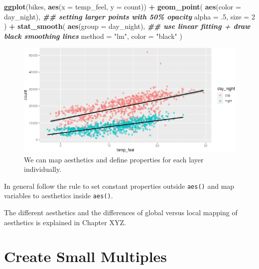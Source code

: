 \documentclass[
]{krantz}
\makeatletter
\newenvironment{Shaded}{\begin{snugshade}}{\end{snugshade}}
\newcommand{\AttributeTok}[1]{\textcolor[rgb]{0.27,0.27,0.27}{#1}}
\newcommand{\DecValTok}[1]{\textcolor[rgb]{0.06,0.06,0.06}{#1}}
\newcommand{\DocumentationTok}[1]{\textcolor[rgb]{0.37,0.37,0.37}{\textbf{\textit{#1}}}}
\newcommand{\FunctionTok}[1]{\textcolor[rgb]{0.27,0.27,0.27}{\textbf{#1}}}
\newcommand{\NormalTok}[1]{#1}
\newcommand{\SpecialCharTok}[1]{\textcolor[rgb]{0.43,0.43,0.43}{\textbf{#1}}}
\newcommand{\StringTok}[1]{\textcolor[rgb]{0.5,0.5,0.5}{#1}}
\newenvironment{kframe}{%
\medskip{}
\setlength{\fboxsep}{.8em}
 \def\at@end@of@kframe{}%
 \ifinner\ifhmode%
  \def\at@end@of@kframe{\end{minipage}}%
  \begin{minipage}{\columnwidth}%
 \fi\fi%
 \def\FrameCommand##1{\hskip\@totalleftmargin \hskip-\fboxsep
 \colorbox{shadecolor}{##1}\hskip-\fboxsep
     \hskip-\linewidth \hskip-\@totalleftmargin \hskip\columnwidth}%
 \MakeFramed {\advance\hsize-\width
   \@totalleftmargin\z@ \linewidth\hsize
   \@setminipage}}%
 {\par\unskip\endMakeFramed%
 \at@end@of@kframe}
\renewenvironment{Shaded}{\begin{kframe}}{\end{kframe}}
\makeatother
\begin{document}
\begin{Shaded}
\begin{Highlighting}[]
\FunctionTok{ggplot}\NormalTok{(bikes, }\FunctionTok{aes}\NormalTok{(}\AttributeTok{x =}\NormalTok{ temp\_feel, }\AttributeTok{y =}\NormalTok{ count)) }\SpecialCharTok{+} 
  \FunctionTok{geom\_point}\NormalTok{(}
    \FunctionTok{aes}\NormalTok{(}\AttributeTok{color =}\NormalTok{ day\_night), }
    \DocumentationTok{\#\# setting larger points with 50\% opacity}
    \AttributeTok{alpha =}\NormalTok{ .}\DecValTok{5}\NormalTok{, }\AttributeTok{size =} \DecValTok{2}
\NormalTok{  ) }\SpecialCharTok{+} 
  \FunctionTok{stat\_smooth}\NormalTok{(}
    \FunctionTok{aes}\NormalTok{(}\AttributeTok{group =}\NormalTok{ day\_night), }
    \DocumentationTok{\#\# use linear fitting + draw black smoothing lines}
    \AttributeTok{method =} \StringTok{"lm"}\NormalTok{, }\AttributeTok{color =} \StringTok{"black"}
\NormalTok{  )}
\end{Highlighting}
\end{Shaded}

\begin{figure}
\centering
\includegraphics{bookdown_files/figure-latex/04ggplotBasicAdjustLayers-1.png}
\caption{\label{fig:04ggplotBasicAdjustLayers}We can map aesthetics and define properties for each layer individually.}
\end{figure}

In general follow the rule to set constant properties outside \texttt{aes()} and map variables to aesthetics inside \texttt{aes()}.

The different aesthetics and the differences of global versus local mapping of aesthetics is explained in Chapter XYZ.

\hypertarget{faceting}{%
\section{Create Small Multiples}\label{faceting}}
\end{document}
